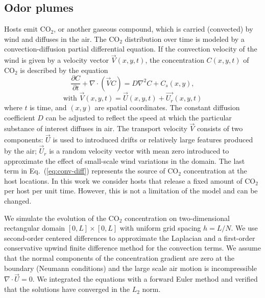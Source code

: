 \documentclass[12pt]{article}
\newif\ifcommentsw
\newcommand{\comment}[1]{\ifcommentsw  $\blacktriangleright$\ \textbf{#1}\ $\blacktriangleleft$ \fi}
\begin{document}
\subsection{Odor plumes}
Hosts emit CO$_2$, or another gaseous compound, which is carried (convected) by wind
and diffuses in the air.  The CO$_2$ distribution over time is modeled by a convection-diffusion partial differential equation.  If the convection velocity of the wind is given by
a velocity vector ${\vec V}(x,y,t)$, the concentration $C(x,y,t)$ of CO$_2$ is described by the  equation
\begin{equation}\label{eq:conv-diff}
\frac{\partial C}{\partial t} + \nabla\cdot ( {\vec V} C ) = D\nabla^2 C + C_s(x,y),
\end{equation}
\[
\mbox{with\ \ \  } \vec{V}(x,y,t) = \vec{U}(x,y,t) + \vec{U_r}(x,y,t)
\]
where $t$ is time, and $(x,y)$ are spatial coordinates.  The constant diffusion coefficient $D$ can be adjusted to reflect the speed at which the particular substance of interest diffuses in air.
The transport velocity $\vec{V}$ consists of two components: $\vec{U}$ is used to introduced drifts or
relatively large features produced by the air;
$\vec{U}_r$ is a random velocity vector with mean zero
introduced to approximate the effect of small-scale wind variations in the domain.  The last term
in Eq.~(\ref{eq:conv-diff}) represents the source of CO$_2$ concentration at the host locations.
In this work we consider hosts that release a fixed amount of CO$_2$ per host per
unit time. However, this is not a limitation of the model and can be changed.
		
We simulate the evolution of the CO$_2$ concentration on two-dimensional rectangular domain $[0,L] \times [0,L]$ with uniform grid spacing $h = L/N$.  We use second-order centered differences to approximate the Laplacian and  a first-order conservative upwind finite difference method for the convection terms. We assume that the normal components of the concentration gradient are zero at the boundary (Neumann conditions) and the large scale air motion is incompressible $\nabla\cdot \vec{U} = 0$.  We integrated the equations with a forward Euler method and verified that the solutions have converged in the $L_2$ norm.
\end{document}
